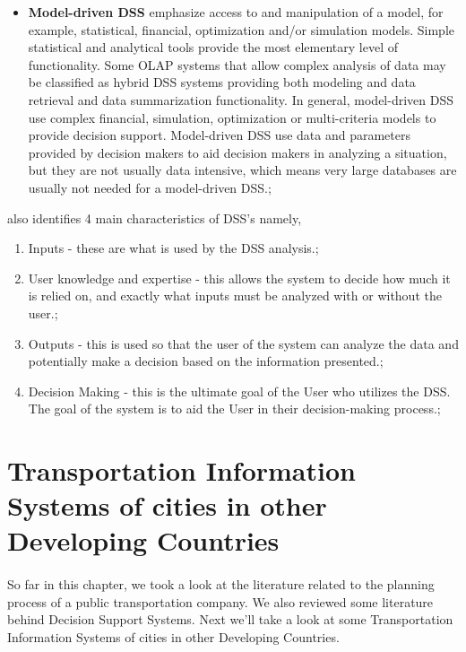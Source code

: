 \documentclass[12pt, oneside]{report}
\begin{document}
\begin {itemize}
\item \textbf{Model-driven DSS} emphasize access to and manipulation of a model, for example, statistical, financial, optimization and/or simulation models. Simple statistical and analytical tools provide the most elementary level of functionality. Some OLAP systems that allow complex analysis of data may be classified as hybrid DSS systems providing both modeling and data retrieval and data summarization functionality. In general, model-driven DSS use complex financial, simulation, optimization or multi-criteria models to provide decision support. Model-driven DSS use data and parameters provided by decision makers to aid decision makers in analyzing a situation, but they are not usually data intensive, which means very large databases are usually not needed for a model-driven DSS.;
\end {itemize}

\citep{Power2003} also identifies 4 main characteristics of DSS's namely,

\begin {enumerate}
\item Inputs - these are what is used by the DSS analysis.;
\item User knowledge and expertise - this allows the system to decide how much it is relied on, and exactly what inputs must be analyzed with or without the user.;
\item Outputs - this is used so that the user of the system can analyze the data and potentially make a decision based on the information presented.;
\item Decision Making - this is the ultimate goal of the User who utilizes the DSS. The goal of the system is to aid the User in their decision-making process.;
\end {enumerate}

\newpage

\section{Transportation Information Systems of cities in other Developing Countries}

\paragraph{} So far in this chapter, we took a look at the literature related to the planning process of a public transportation company. We also reviewed some literature behind Decision Support Systems. Next we'll take a look at some Transportation Information Systems of cities in other Developing Countries.
\end{document}
